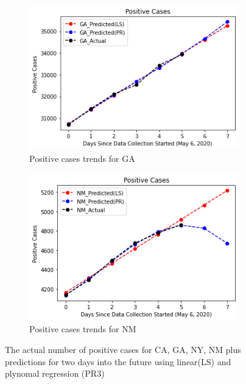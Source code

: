 \documentclass[11pt]{article}
\begin{document}
\begin{figure}[h]
\begin{subfigure}[b]{0.49\textwidth}
         \includegraphics[width=\textwidth]{diagrams/analysis/positive_trend_GA.png}
         \caption{Positive cases trends for GA}
     \end{subfigure}
     \begin{subfigure}[b]{0.49\textwidth}
         \centering
         \includegraphics[width=\textwidth]{diagrams/analysis/positive_trend_NM.png}
         \caption{Positive cases trends for NM}
         \label{fig:three sin x}
     \end{subfigure}
        \caption{The actual number of positive cases for CA, GA, NY, NM plus predictions for two days into the future using linear(LS) and plynomal regression (PR3)}
        \label{fig:pos_trends}

\end{figure}
\FloatBarrier
\end{document}

